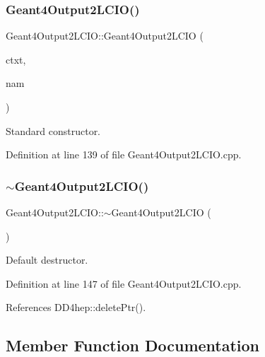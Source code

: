 \subsubsection{\texorpdfstring{Geant4\+Output2\+L\+C\+I\+O()}{Geant4Output2LCIO()}}
{\footnotesize\ttfamily Geant4\+Output2\+L\+C\+I\+O\+::\+Geant4\+Output2\+L\+C\+IO (\begin{DoxyParamCaption}\item[{\hyperlink{class_d_d4hep_1_1_simulation_1_1_geant4_context}{Geant4\+Context} $\ast$}]{ctxt,  }\item[{const std\+::string \&}]{nam }\end{DoxyParamCaption})}



Standard constructor. 



Definition at line 139 of file Geant4\+Output2\+L\+C\+I\+O.\+cpp.

\hypertarget{class_d_d4hep_1_1_simulation_1_1_geant4_output2_l_c_i_o_a7d9a334e6ba95f422f8ecf97c0593fa6}{}\label{class_d_d4hep_1_1_simulation_1_1_geant4_output2_l_c_i_o_a7d9a334e6ba95f422f8ecf97c0593fa6} 
\subsubsection{\texorpdfstring{$\sim$\+Geant4\+Output2\+L\+C\+I\+O()}{~Geant4Output2LCIO()}}
{\footnotesize\ttfamily Geant4\+Output2\+L\+C\+I\+O\+::$\sim$\+Geant4\+Output2\+L\+C\+IO (\begin{DoxyParamCaption}{ }\end{DoxyParamCaption})\hspace{0.3cm}{\ttfamily [virtual]}}



Default destructor. 



Definition at line 147 of file Geant4\+Output2\+L\+C\+I\+O.\+cpp.



References D\+D4hep\+::delete\+Ptr().



\subsection{Member Function Documentation}
\hypertarget{class_d_d4hep_1_1_simulation_1_1_geant4_output2_l_c_i_o_a36b7ecdf04169c4597bae18e021b60ea}{}\label{class_d_d4hep_1_1_simulation_1_1_geant4_output2_l_c_i_o_a36b7ecdf04169c4597bae18e021b60ea} 
